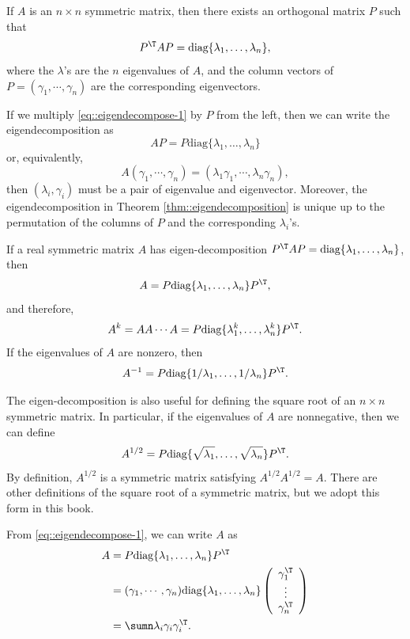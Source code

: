 \begin{theorem}\label{thm::eigendecomposition}
If $A$ is an $n\times n$ symmetric matrix, then there exists
an orthogonal matrix $P$ such that 
\begin{equation}
\label{eq::eigendecompose-1}
P^{\T}AP=\textup{diag}\{\lambda_{1},\ldots,\lambda_{n}\},
\end{equation}
where the $\lambda$'s are the $n$ eigenvalues of $A$, and the column vectors of $P=(\gamma_{1},\cdots,\gamma_{n})$ are the corresponding eigenvectors. 
\end{theorem}

If we multiply \eqref{eq::eigendecompose-1} by $P$ from the left, then we can write the eigendecomposition as 
$$
AP=P\text{diag}\{\lambda_{1},\ldots,\lambda_{n}\}
$$
or, equivalently,
$$
A(\gamma_{1},\cdots,\gamma_{n}) = (\lambda_1 \gamma_{1},\cdots, \lambda_{n}\gamma_{n}),
$$
then $(\lambda_i,\gamma_i)$ must be a pair of eigenvalue and eigenvector. Moreover, the eigendecomposition in Theorem \ref{thm::eigendecomposition} is unique up to the permutation of the columns of $P$ and the corresponding $\lambda_i$'s. 

\begin{corollary}
If a real symmetric matrix $A$ has eigen-decomposition $P^{\T}AP=\textup{diag}\{\lambda_{1},\ldots,\lambda_{n}\}$, then 
$$
A=P\textup{diag}\{\lambda_{1},\ldots,\lambda_{n}\}P^{\T},
$$
and therefore,
$$
A^{k}=A A\cdots A=P\textup{diag}\{\lambda_{1}^{k},\ldots,\lambda_{n}^{k}\}P^{\T}.
$$
If the eigenvalues of $A$ are nonzero, then 
$$A^{-1}=P\textup{diag}\{1/\lambda_{1},\ldots,1/\lambda_{n}\}P^{\T}.$$
\end{corollary}


The eigen-decomposition is also useful for defining the square root
of an $n\times n$ symmetric matrix. In particular, if the eigenvalues
of $A$ are nonnegative, then we can define
\[
A^{1/2}=P\text{diag}\{\sqrt{\lambda_{1}},\ldots,\sqrt{\lambda_{n}}\}P^{\T} . 
\]
By definition, $A^{1/2}$ is a symmetric matrix satisfying $A^{1/2}A^{1/2}=A.$
There are other definitions of the square root of a symmetric matrix,
but we adopt this form in this book.

From \eqref{eq::eigendecompose-1}, we can write $A$ as 
\begin{align*}
A & =P\text{diag}\{\lambda_{1},\ldots,\lambda_{n}\}P^{\T}\\
 & =(\gamma_{1},\cdots,\gamma_{n})\text{diag}\{\lambda_{1},\ldots,\lambda_{n}\}\left(\begin{array}{c}
\gamma_{1}^{\T}\\
\vdots\\
\gamma_{n}^{\T}
\end{array}\right)\\
 & =\sumn\lambda_{i}\gamma_{i}\gamma_{i}^{\T}. 
\end{align*}
 


